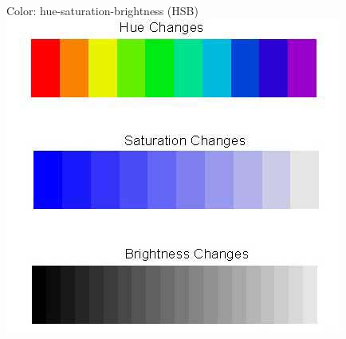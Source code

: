 \documentclass[xcolor=table,aspectratio=169]{beamer}
\begin{document}
\begin{frame}{Color: hue-saturation-brightness (HSB)}
  \includegraphics[height=0.8\textheight]{pics/hsb.jpg}
\end{frame}
\end{document}
